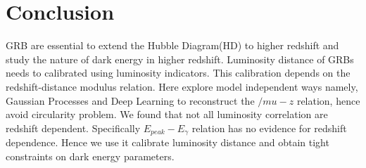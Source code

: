 \section{Conclusion}
GRB are essential to extend the Hubble Diagram(HD) to higher redshift and study the nature of dark energy in higher redshift. Luminosity distance of GRBs needs to calibrated using luminosity indicators. This calibration depends on the redshift-distance modulus relation. Here explore model independent ways namely, Gaussian Processes and Deep Learning to reconstruct the $/mu-z$ relation, hence avoid circularity problem. We found that not all luminosity correlation are redshift dependent. Specifically $E_{peak}-E_{\gamma}$ relation has no evidence for redshift dependence. Hence we use it calibrate luminosity distance and obtain tight constraints on dark energy parameters.

